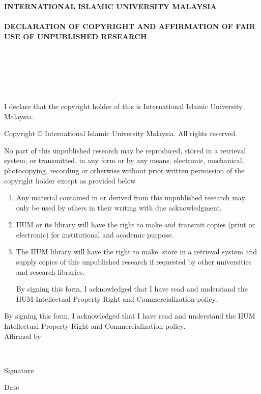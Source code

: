 \documentclass[12pt, a4paper, oneside, showtrims]{memoir}
\begin{document}
\thispagestyle{empty}

\begin{center}
{\fontsize{14bp}{16bp}\selectfont
\textbf{\MakeUppercase{International Islamic University Malaysia}}\\~\\
\textbf{\MakeUppercase{Declaration of Copyright and Affirmation of Fair Use of 
Unpublished Research}}\\~\\
\textbf{\MakeUppercase{\myTitle}}\\
\ifdefined\mySubtitle
\textbf{\MakeUppercase{\mySubtitle}}\\~\\
\else
\\~\\
\fi}
\noindent I declare that the copyright holder of this \myDocument is 
International Islamic University Malaysia.\\
\end{center}

\begin{center}
{\fontsize{10bp}{12bp}\selectfont
\noindent Copyright \copyright{} \myYear International Islamic 
University 
Malaysia. All rights reserved.}\\
\end{center}

\noindent No part of this unpublished research may be reproduced, stored in a 
retrieval
system, or transmitted, in any form or by any means, electronic, mechanical,
photocopying, recording or otherwise without prior written permission of the
copyright holder except as provided below

\begin{enumerate}
\item Any material contained in or derived from this unpublished research
may only be used by others in their writing with due acknowledgment.

\item IIUM or its library will have the right to make and transmit copies
(print or electronic) for institutional and academic purpose.

\item The IIUM library will have the right to make, store in a retrieval system
and supply copies of this unpublished research if requested by other
universities and research libraries.

By signing this form, I acknowledged that I have read and understand the
IIUM Intellectual Property Right and Commercialization policy.
\end{enumerate}

\noindent By signing this form, I acknowledged that I have read and understand 
the
IIUM Intellectual Property Right and Commercialization policy.\\[48pt]

\noindent Affirmed by \myName\\

\vfill

\noindent \makebox[2in]{\dotfill} \hfill \makebox[2in]{\dotfill}\\
\parbox{2in}{\centering Signature} \hfill \parbox{2in}{\centering Date}
\end{document}
